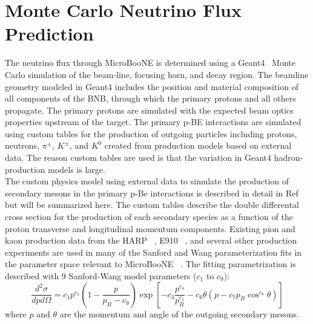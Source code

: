 \section{Monte Carlo Neutrino Flux Prediction}\label{beam_flux_descript_section}

The neutrino flux through MicroBooNE is determined using a Geant4~\cite{GEANT4source} Monte Carlo simulation of the beam-line, focusing horn, and decay region. The beamline geometry modeled in Geant4 includes the position and material composition of all components of the BNB, through which the primary protons and all others propagate. The primary protons are simulated with the expected beam optics properties upstream of the target. The primary p-BE interactions are simulated using custom tables for the production of outgoing particles including protons, neutrons, $\pi^\pm$, $K^\pm$, and $K^0$ created from production models based on external data. The reason custom tables are used is that the variation in Geant4 hadron-production models is large.\\

The custom physics model using external data to simulate the production of secondary mesons in the primary p-Be interactions is described in detail in Ref ~\cite{MBFluxPaper} but will be summarized here. The custom tables describe the double differental cross section for the production of each secondary species as a function of the proton transverse and longitudinal momentum components. Existing pion and kaon production data from the HARP ~\cite{HARPgary8}, E910 ~\cite{E910source}, and several other production experiments are used in many of the Sanford and Wang parameterization fits in the parameter space relevant to MicroBooNE ~\cite{FEYNMANgary6}. The fitting parametrization is described with 9 Sanford-Wang model parameters ($c_1$ to $c_9$):
\begin{equation}\label{SWparamequation}
\frac{d^2\sigma}{dpd\Omega} = c_1p^{c_2}\left(1-\frac{p}{p_B-c_9}\right)\exp\left[-c_3\frac{p^{c_4}}{p_B^{c_5}}-c_6\theta(p-c_7p_B\cos^{c_8}\theta)\right]
\end{equation} 
where $p$ and $\theta$ are the momentum and angle of the outgoing secondary mesons.\\

